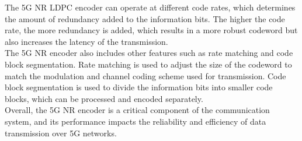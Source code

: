 \documentclass[journal,twocolumn]{IEEEtran}
\begin{document}
The 5G NR LDPC encoder can operate at different code rates, which determines the amount of redundancy added to the information bits. The higher the code rate, the more redundancy is added, which results in a more robust codeword but also increases the latency of the transmission.\\

The 5G NR encoder also includes other features such as rate matching and code block segmentation. Rate matching is used to adjust the size of the codeword to match the modulation and channel coding scheme used for transmission. Code block segmentation is used to divide the information bits into smaller code blocks, which can be processed and encoded separately.\\

Overall, the 5G NR encoder is a critical component of the communication system, and its performance impacts the reliability and efficiency of data transmission over 5G networks.
\end{document}
